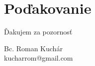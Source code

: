 \documentclass{beamer}
\begin{document}
\section{Poďakovanie}
\begin{frame}
\centering\Large Ďakujem za pozornosť
\vspace{2em}

\centering\normalsize
Bc. Roman Kuchár\\ kucharrom@gmail.com
\end{frame}


\end{document}
